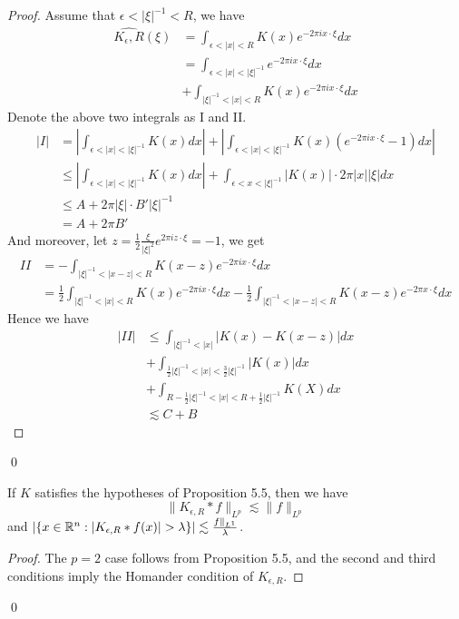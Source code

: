 \begin{proof}
    Assume that $\epsilon<|\xi|^{-1}<R$, we have
    \begin{align*}
        \widehat{K_\epsilon, R}(\xi)&=\int_{\epsilon<|x|<R}K(x)e^{-2\pi ix\cdot\xi}dx\\
        &=\int_{\epsilon<|x|<|\xi|^{-1}}e^{-2\pi ix\cdot\xi}dx\\
        &+\int_{|\xi|^{-1}<|x|<R}K(x)e^{-2\pi ix\cdot\xi}dx
    \end{align*}
    Denote the above two integrals as I and II.
    \begin{align*}
        |I|&=\left|\int_{\epsilon<|x|<|\xi|^{-1}}K(x)dx\right|+\left|\int_{\epsilon<|x|<|\xi|^{-1}}K(x)(e^{-2\pi ix\cdot\xi}-1)dx\right|\\
        &\leq \left|\int_{\epsilon<|x|<|\xi|^{-1}}K(x)dx\right|+\int_{\epsilon<x<|\xi|^{-1}}|K(x)|\cdot 2\pi |x||\xi|dx\\
        &\leq A+2\pi|\xi|\cdot B'|\xi|^{-1}\\
        &= A+2\pi B'
    \end{align*}
    And moreover, let $z=\frac{1}{2}\frac{\xi}{|\xi|^2}e^{2\pi iz\cdot\xi}=-1$, we get
    \begin{align*}
        II&=-\int_{|\xi|^{-1}<|x-z|<R}K(x-z)e^{-2\pi ix\cdot\xi}dx\\
        &=\frac{1}{2}\int_{|\xi|^{-1}<|x|<R}K(x)e^{-2\pi ix\cdot\xi}dx-\frac{1}{2}\int_{|\xi|^{-1}<|x-z|<R}K(x-z)e^{-2\pi x\cdot\xi}dx
    \end{align*}
    Hence we have
    \begin{align*}
        |II|&\leq\int_{|\xi|^{-1}<|x|}|K(x)-K(x-z)|dx\\
        &+\int_{\frac{1}{2}|\xi|^{-1}<|x|<\frac{3}{2}|\xi|^{-1}}|K(x)|dx\\
        &+\int_{R-\frac{1}{2}|\xi|^{-1}<|x|<R+\frac{1}{2}|\xi|^{-1}}K(X)dx\\
        &\lesssim C+B
    \end{align*}
\end{proof}
\qed

\begin{corollary}
    If $K$ satisfies the hypotheses of Proposition 5.5, then we have
    \begin{equation*}
        \|K_{\epsilon, R}\ast f\|_{L^p}\lesssim \|f\|_{L^p}
    \end{equation*}
    and $|\{x\in\R^n: |K_{\epsilon, R}\ast f(x)|>\lambda\}|\lesssim\frac{\\f\|_{L^1}}{\lambda}$.
\end{corollary}
\begin{proof}
    The $p=2$ case follows from Proposition 5.5, and the second and third conditions imply the Homander condition of $K_{\epsilon, R}$.
\end{proof}
\qed

